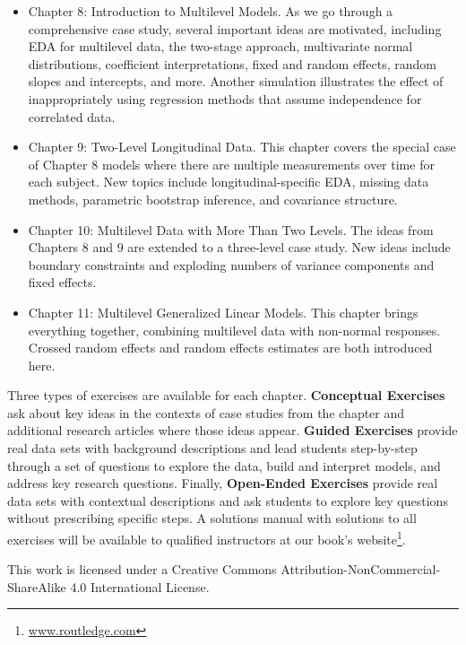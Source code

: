 \documentclass[
]{krantz}
\renewcommand{\href}[2]{#2\footnote{\url{#1}}}
\begin{document}
\begin{itemize}
\item
  Chapter 8: Introduction to Multilevel Models. As we go through a comprehensive case study, several important ideas are motivated, including EDA for multilevel data, the two-stage approach, multivariate normal distributions, coefficient interpretations, fixed and random effects, random slopes and intercepts, and more. Another simulation illustrates the effect of inappropriately using regression methods that assume independence for correlated data.
\item
  Chapter 9: Two-Level Longitudinal Data. This chapter covers the special case of Chapter 8 models where there are multiple measurements over time for each subject. New topics include longitudinal-specific EDA, missing data methods, parametric bootstrap inference, and covariance structure.
\item
  Chapter 10: Multilevel Data with More Than Two Levels. The ideas from Chapters 8 and 9 are extended to a three-level case study. New ideas include boundary constraints and exploding numbers of variance components and fixed effects.
\item
  Chapter 11: Multilevel Generalized Linear Models. This chapter brings everything together, combining multilevel data with non-normal responses. Crossed random effects and random effects estimates are both introduced here.
\end{itemize}

Three types of exercises are available for each chapter. \textbf{Conceptual Exercises} ask about key ideas in the contexts of case studies from the chapter and additional research articles where those ideas appear. \textbf{Guided Exercises} provide real data sets with background descriptions and lead students step-by-step through a set of questions to explore the data, build and interpret models, and address key research questions. Finally, \textbf{Open-Ended Exercises} provide real data sets with contextual descriptions and ask students to explore key questions without prescribing specific steps. A solutions manual with solutions to all exercises will be available to qualified instructors at our \href{www.routledge.com}{book's website}.

This work is licensed under a Creative Commons Attribution-NonCommercial-ShareAlike 4.0 International License.
\end{document}
